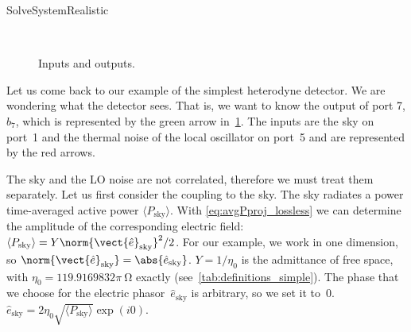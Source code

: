 \begin{algorithm}
    \caption{SolveSystemRealistic}
    \label{algo:solve_system_realistic}
    \begin{algorithmic}
         
         
         
                 
            \EndFor
        \EndFor
    \\ 
    \EndFunction
    \end{algorithmic}
\end{algorithm}

\begin{figure}[hbtp]
    \centering
    
    \caption{Inputs and outputs.}
    \label{fig:implementation_3}
\end{figure}

Let us come back to our example of the simplest heterodyne detector.
We are wondering what the detector sees.
That is, we want to know the output of port 7, $b_7$, which is represented by the green arrow in~\cref{fig:implementation_3}.
The inputs are the sky on port~1 and the thermal noise of the local oscillator on port~5 and are represented by the red arrows.

The sky and the LO noise are not correlated, therefore we must treat them separately.
Let us first consider the coupling to the sky.
The sky radiates a power time-averaged active power $\langle P_\text{sky} \rangle$.
With \cref{eq:avgPproj_lossless} we can determine the amplitude of the corresponding electric field:
$\langle P_\text{sky} \rangle = Y\norm{\vect{\hat{e}}_\text{sky}}^2 / 2$.
For our example, we work in one dimension, so
$\norm{\vect{\hat{e}}_\text{sky}} = \abs{\hat{e}_\text{sky}}$.
$Y=1/\eta_0$ is the admittance of free space, with $\eta_0 = 119.9169832\pi~\si{\ohm}$ exactly (see~\cref{tab:definitions_simple}).
The phase that we choose for the electric phasor~$\hat{e}_\text{sky}$ is arbitrary, so we set it to~0.
$\hat{e}_\text{sky} = 2 \eta_0 \sqrt{\langle P_\text{sky} \rangle} \exp(i0)$.

